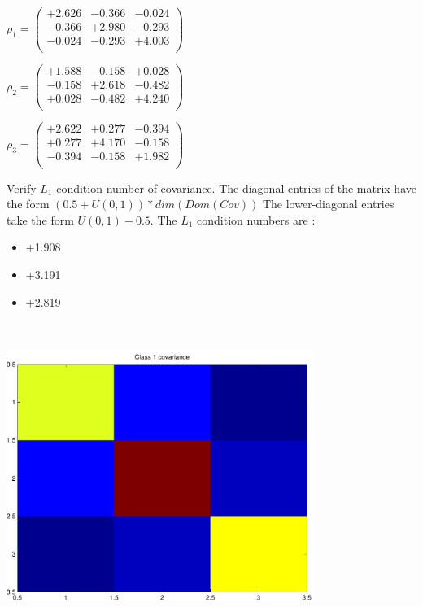 \documentclass[9pt]{article}
\theoremstyle{plain}
\theoremstyle{definition}
\theoremstyle{remark}
\numberwithin{equation}{section}
\begin{document}
$\rho_1 = \left(
\begin{array}{
ccc}
+2.626 & -0.366 & -0.024 \\
-0.366 & +2.980 & -0.293 \\
-0.024 & -0.293 & +4.003 \\
\end{array}
\right)$ \newline 

$\rho_2 = \left(
\begin{array}{
ccc}
+1.588 & -0.158 & +0.028 \\
-0.158 & +2.618 & -0.482 \\
+0.028 & -0.482 & +4.240 \\
\end{array}
\right)$ \newline 

$\rho_3 = \left(
\begin{array}{
ccc}
+2.622 & +0.277 & -0.394 \\
+0.277 & +4.170 & -0.158 \\
-0.394 & -0.158 & +1.982 \\
\end{array}
\right)$ \newline 

Verify $L_1$ condition number of covariance. The diagonal entries of the matrix have the form $(0.5 + U(0,1) )*dim(Dom(Cov))$
The lower-diagonal entries take the form $U(0,1) - 0.5$. 
The $L_1$ condition numbers are :
\begin{itemize}
\item +1.908
\item +3.191
\item +2.819
\end{itemize}
\includegraphics[width=10.0cm,height=10.0cm]{rv1_corr.pdf}
\end{document}
